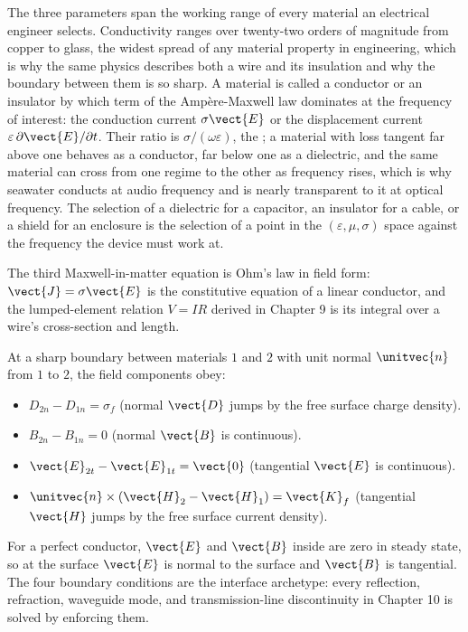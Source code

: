 The three parameters span the working range of every material an
electrical engineer selects. Conductivity ranges over twenty-two orders
of magnitude from copper to glass, the widest spread of any material
property in engineering, which is why the same physics describes both a
wire and its insulation and why the boundary between them is so sharp. A
material is called a conductor or an insulator by which term of the
Amp\`ere-Maxwell law dominates at the frequency of interest: the
conduction current $\sigma\vect{E}$ or the displacement current
$\varepsilon\,\partial\vect{E}/\partial t$. Their ratio is $\sigma/
(\omega\varepsilon)$, the ; a material with loss
tangent far above one behaves as a conductor, far below one as a
dielectric, and the same material can cross from one regime to the other
as frequency rises, which is why seawater conducts at audio frequency
and is nearly transparent to it at optical frequency. The selection of a
dielectric for a capacitor, an insulator for a cable, or a shield for an
enclosure is the selection of a point in the
$(\varepsilon, \mu, \sigma)$ space against the frequency the device must
work at.

The third Maxwell-in-matter equation is Ohm's law in field form:
$\vect{J} = \sigma \vect{E}$ is the constitutive equation of a linear
conductor, and the lumped-element relation $V = IR$ derived in
Chapter 9 is its integral over a wire's cross-section and length.

At a sharp boundary between materials $1$ and $2$ with unit normal
$\unitvec{n}$ from $1$ to $2$, the field components obey:
\begin{itemize}[leftmargin=*]
  \item $D_{2n} - D_{1n} = \sigma_{f}$ (normal $\vect{D}$ jumps by the
    free surface charge density).
  \item $B_{2n} - B_{1n} = 0$ (normal $\vect{B}$ is continuous).
  \item $\vect{E}_{2t} - \vect{E}_{1t} = \vect{0}$ (tangential
    $\vect{E}$ is continuous).
  \item $\unitvec{n}\times(\vect{H}_{2} - \vect{H}_{1}) = \vect{K}_{f}$
    (tangential $\vect{H}$ jumps by the free surface current
    density).
\end{itemize}
For a perfect conductor, $\vect{E}$ and $\vect{B}$ inside are zero in
steady state, so at the surface $\vect{E}$ is normal to the surface
and $\vect{B}$ is tangential. The four boundary conditions are the
interface archetype: every reflection, refraction, waveguide mode, and
transmission-line discontinuity in Chapter 10 is solved by enforcing
them.

